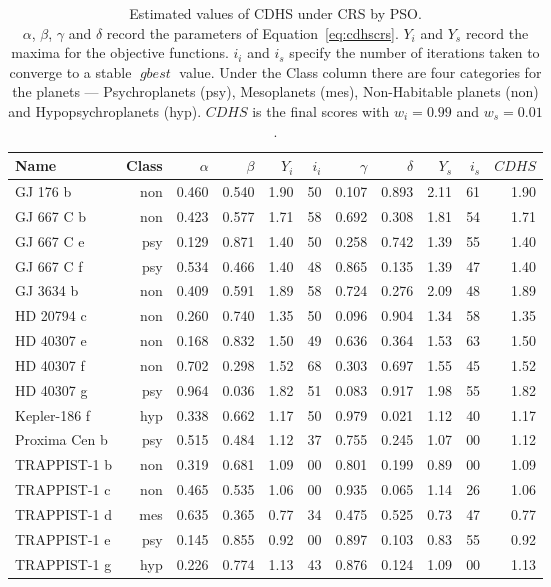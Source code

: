 \documentclass[10pt]{article}
\DeclareMathOperator*{\gbest}{\mathit{gbest}}
\begin{document}
\begin{table}
  \centering
  \begin{tabular}{l r r r r r r r r r r}
    \toprule
    Name & Class & $\alpha$ & $\beta$ & $Y_i$ & $i_i$ & $\gamma$ & $\delta$ & $Y_s$ & $i_s$ & $\mathit{CDHS}$\\
    \midrule
    GJ 176 b & non & 0.460 & 0.540 & 1.90 & 50 & 0.107 & 0.893 & 2.11 & 61 & 1.90\\
    GJ 667 C b & non & 0.423 & 0.577 & 1.71 & 58 & 0.692 & 0.308 & 1.81 & 54 & 1.71\\
    GJ 667 C e & psy & 0.129 & 0.871 & 1.40 & 50 & 0.258 & 0.742 & 1.39 & 55 & 1.40\\
    GJ 667 C f & psy & 0.534 & 0.466 & 1.40 & 48 & 0.865 & 0.135 & 1.39 & 47 & 1.40\\
    GJ 3634 b & non & 0.409 & 0.591 & 1.89 & 58 & 0.724 & 0.276 & 2.09 & 48 & 1.89\\
    HD 20794 c & non & 0.260 & 0.740 & 1.35 & 50 & 0.096 & 0.904 & 1.34 & 58 & 1.35\\
    HD 40307 e & non & 0.168 & 0.832 & 1.50 & 49 & 0.636 & 0.364 & 1.53 & 63 & 1.50\\
    HD 40307 f & non & 0.702 & 0.298 & 1.52 & 68 & 0.303 & 0.697 & 1.55 & 45 & 1.52\\
    HD 40307 g & psy & 0.964 & 0.036 & 1.82 & 51 & 0.083 & 0.917 & 1.98 & 55 & 1.82\\
    Kepler-186 f & hyp & 0.338 & 0.662 & 1.17 & 50 & 0.979 & 0.021 & 1.12 & 40 & 1.17\\
    Proxima Cen b & psy & 0.515 & 0.484 & 1.12 & 37 & 0.755 & 0.245 & 1.07 & 00 & 1.12\\
    TRAPPIST-1 b & non & 0.319 & 0.681 & 1.09 & 00 & 0.801 & 0.199 & 0.89 & 00 & 1.09\\
    TRAPPIST-1 c & non & 0.465 & 0.535 & 1.06 & 00 & 0.935 & 0.065 & 1.14 & 26 & 1.06\\
    TRAPPIST-1 d & mes & 0.635 & 0.365 & 0.77 & 34 & 0.475 & 0.525 & 0.73 & 47 & 0.77\\
    TRAPPIST-1 e & psy & 0.145 & 0.855 & 0.92 & 00 & 0.897 & 0.103 & 0.83 & 55 & 0.92\\
    TRAPPIST-1 g & hyp & 0.226 & 0.774 & 1.13 & 43 & 0.876 & 0.124 & 1.09 & 00 & 1.13\\
    \bottomrule
  \end{tabular}
  \caption{Estimated values of CDHS under CRS by PSO.\\
    \footnotesize $\alpha$, $\beta$, $\gamma$ and $\delta$ record the parameters of Equation~\ref{eq:cdhscrs}. $Y_i$
    and $Y_s$ record the maxima for the objective functions. $i_i$ and $i_s$ specify the number of iterations taken to
    converge to a stable $\gbest$ value. Under the Class column there are four categories for the planets ---
    Psychroplanets (psy), Mesoplanets (mes), Non-Habitable planets (non) and Hypopsychroplanets (hyp).  $\mathit{CDHS}$
    is the final scores with $w_i=0.99$ and $w_s=0.01$.
  }\label{tab:cdhscrs}
\end{table}
\end{document}
